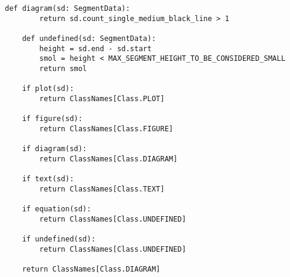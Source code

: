 \begin{lstlisting}[caption={Функция handle\_medium\_black\_line}, label={lst:}]
    def diagram(sd: SegmentData):
        return sd.count_single_medium_black_line > 1

    def undefined(sd: SegmentData):
        height = sd.end - sd.start
        smol = height < MAX_SEGMENT_HEIGHT_TO_BE_CONSIDERED_SMALL
        return smol

    if plot(sd):
        return ClassNames[Class.PLOT]

    if figure(sd):
        return ClassNames[Class.FIGURE]

    if diagram(sd):
        return ClassNames[Class.DIAGRAM]

    if text(sd):
        return ClassNames[Class.TEXT]

    if equation(sd):
        return ClassNames[Class.UNDEFINED]

    if undefined(sd):
        return ClassNames[Class.UNDEFINED]

    return ClassNames[Class.DIAGRAM]
\end{lstlisting}

